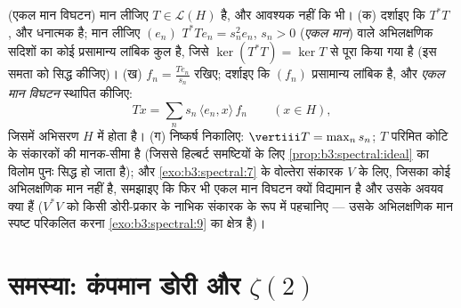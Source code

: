 \begin{exercise}[$\star\star\star$]\label{exo:b3:spectral:12}
(एकल मान विघटन) मान लीजिए $T \in \mathcal L(H)$ \emph{} है, और आवश्यक नहीं कि
 भी।
(क) दर्शाइए कि $T^*T$ ,  और धनात्मक है; मान लीजिए
$(e_n)$ $T^*Te_n = s_n^2e_n$, $s_n > 0$ (\emph{एकल मान}) वाले अभिलक्षणिक सदिशों का
कोई प्रसामान्य लांबिक कुल है, जिसे $\ker(T^*T) = \ker T$ से पूरा किया गया है (इस
समता को सिद्ध कीजिए)।
(ख) $f_n = \frac{Te_n}{s_n}$ रखिए; दर्शाइए कि $(f_n)$ प्रसामान्य लांबिक है, और
\emph{एकल मान विघटन} स्थापित कीजिए:
\[
Tx = \sum_n s_n\,\langle e_n, x\rangle\,f_n
\qquad (x \in H),
\]
जिसमें अभिसरण $H$ में होता है।
(ग) निष्कर्ष निकालिए: $\vertiii T = \max_ns_n$; $T$ परिमित कोटि के संकारकों की
मानक-सीमा है (जिससे हिल्बर्ट समष्टियों के लिए \cref{prop:b3:spectral:ideal} का विलोम पुनः
सिद्ध हो जाता है); और \cref{exo:b3:spectral:7} के वोल्तेरा संकारक $V$ के लिए, जिसका
कोई अभिलक्षणिक मान नहीं है, समझाइए कि फिर भी एकल मान विघटन क्यों
विद्यमान है और उसके अवयव क्या हैं ($V^*V$ को किसी डोरी-प्रकार के
नाभिक संकारक के रूप में पहचानिए --- उसके अभिलक्षणिक मान स्पष्ट
परिकलित करना \cref{exo:b3:spectral:9} का क्षेत्र है)।
\end{exercise}

\section{समस्या: कंपमान डोरी और \texorpdfstring{$\zeta(2)$}{ZETA(2)}}

